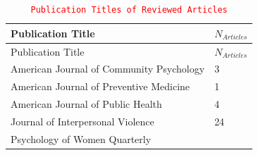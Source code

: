 \documentclass[]{tufte-handout}
\newcommand{\edit}[1]{
    \textcolor{red}{
        \texttt{#1}
    }
}
\begin{document}
\begin{longtable}[]{@{}ll@{}}
\caption{\edit{Publication Titles of Reviewed Articles}}\tabularnewline
\toprule
\begin{minipage}[b]{0.56\columnwidth}\raggedright\strut
Publication Title\strut
\end{minipage} & \begin{minipage}[b]{0.21\columnwidth}\raggedright\strut
\(N_{Articles}\)\strut
\end{minipage}\tabularnewline
\midrule
\endfirsthead
\toprule
\begin{minipage}[b]{0.56\columnwidth}\raggedright\strut
Publication Title\strut
\end{minipage} & \begin{minipage}[b]{0.21\columnwidth}\raggedright\strut
\(N_{Articles}\)\strut
\end{minipage}\tabularnewline
\midrule
\endhead
\begin{minipage}[t]{0.56\columnwidth}\raggedright\strut
American Journal of Community Psychology\strut
\end{minipage} & \begin{minipage}[t]{0.21\columnwidth}\raggedright\strut
3\strut
\end{minipage}\tabularnewline
\begin{minipage}[t]{0.56\columnwidth}\raggedright\strut
American Journal of Preventive Medicine\strut
\end{minipage} & \begin{minipage}[t]{0.21\columnwidth}\raggedright\strut
1\strut
\end{minipage}\tabularnewline
\begin{minipage}[t]{0.56\columnwidth}\raggedright\strut
American Journal of Public Health\strut
\end{minipage} & \begin{minipage}[t]{0.21\columnwidth}\raggedright\strut
4\strut
\end{minipage}\tabularnewline
\begin{minipage}[t]{0.56\columnwidth}\raggedright\strut
Journal of Interpersonal Violence\strut
\end{minipage} & \begin{minipage}[t]{0.21\columnwidth}\raggedright\strut
24\strut
\end{minipage}\tabularnewline
\begin{minipage}[t]{0.56\columnwidth}\raggedright\strut
Psychology of Women Quarterly\strut
\end{minipage} & \begin{minipage}[t]{0.21\columnwidth}\raggedright\strut

\end{minipage}
\end{longtable}
\end{document}
